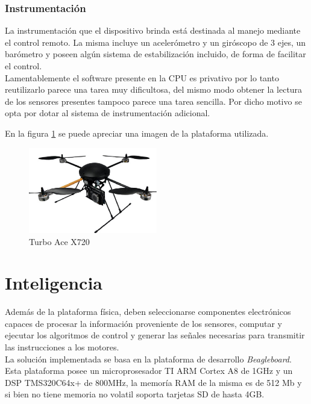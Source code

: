 \documentclass[main]{subfiles}
\begin{document}
\subsubsection*{Instrumentaci\'on}

	La instrumentaci\'on que el dispositivo brinda est\'a destinada al manejo mediante el control remoto. La misma incluye un aceler\'ometro y un gir\'oscopo de 3 ejes, un bar\'ometro y poseen alg\'un sistema de estabilizaci\'on incluido, de forma de facilitar el control. \\

Lamentablemente el software presente en la CPU es privativo por lo tanto reutilizarlo parece una tarea muy dificultosa, del mismo modo obtener la lectura de los sensores presentes tampoco parece una tarea sencilla. Por dicho motivo se opta por dotar al sistema de instrumentaci\'on adicional. 

En la figura \ref{fig:cuadricoptero} se puede apreciar una imagen de la plataforma utilizada.
\begin{figure}[H]
	\centering
	\includegraphics[width=0.5\textwidth]{./pics_eleccion_hardware/turboace.png}
	\caption{Turbo Ace X720}
	\label{fig:cuadricoptero}
\end{figure}


\section{Inteligencia}

Adem\'as de la plataforma f\'isica, deben seleccionarse componentes electr\'onicos capaces de procesar la informaci\'on proveniente de los sensores, computar y ejecutar los algoritmos de control y generar las se\~nales necesarias para transmitir las instrucciones a los motores.\\

La soluci\'on implementada se basa en la plataforma de desarrollo \emph{Beagleboard}. Esta plataforma posee un microprosesador TI ARM Cortex A8 de 1GHz y un DSP TMS320C64x+ de 800MHz, la memor\'ia RAM de la misma es de 512 Mb y si bien no tiene memoria no volatil soporta tarjetas SD de hasta 4GB.
\end{document}
